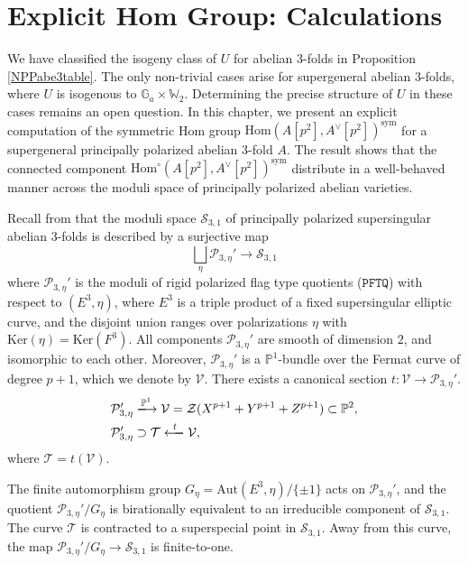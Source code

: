 \documentclass[a4paper,12pt,twoside]{report}
\newcommand{\G}{\mathbb{G}}
\newcommand{\Hom}{\mathrm{Hom}}
\newcommand{\W}{\mathbb{W}}
\newcommand{\sym}{\mathrm{sym}}
\newcommand{\Ker}{\mathrm{Ker}}
\newcommand{\PP}{\mathcal{P}}
\newcommand{\SSS}{\mathcal{S}}
\begin{document}
\chapter{Explicit Hom Group: Calculations} \label{Chap5}

We have classified the isogeny class of $U$ for abelian $3$-folds in Proposition \ref{NPPabe3table}. 
The only non-trivial cases arise for supergeneral abelian $3$-folds, where $U$ is isogenous to $\G_a\times \W_2$. 
Determining the precise structure of $U$ in these cases remains an open question. 
In this chapter, we present an explicit computation of the symmetric Hom group 
$\Hom(A[p^2],A^\vee[p^2])^{\sym}$ for a supergeneral
principally polarized abelian $3$-fold $A$. 
The result shows that the connected component $\Hom^{\circ}(A[p^2],A^\vee[p^2])^{\sym}$ 
distribute in a well-behaved manner 
across the moduli space of principally polarized abelian varieties. 

Recall from \cite{LiOo} that
the moduli space $\SSS_{3,1}$ of principally polarized supersingular abelian $3$-folds 
is described by a surjective map 
\[\bigsqcup_{\eta} \PP_{3,\eta}' \rightarrow \SSS_{3,1}\]
where $\PP_{3,\eta}'$ is the moduli of rigid polarized flag type quotients ($\mathtt{PFTQ}$) with respect to 
$(E^3, \eta)$, where $E^3$ is a triple product of a fixed supersingular elliptic curve, 
and the disjoint union ranges over polarizations $\eta$ with $\Ker(\eta)=\Ker(F^3)$. 
All components $\PP_{3,\eta}'$ are smooth of dimension $2$, and isomorphic to each other. 
Moreover, $\PP_{3,\eta}'$ is a $\mathbb{P}^1$-bundle over the Fermat curve of degree $p+1$, 
which we denote by $\mathcal{V}$. 
There exists a canonical section $t:\mathcal{V}\rightarrow \PP_{3,\eta}'$. 
\[\begin{aligned}
    &\PP_{3,\eta}'\xlongrightarrow{\mathbb{P}^1} \mathcal{V}=\mathcal{Z}(X^{p+1}+Y^{p+1}+Z^{p+1})\subset \mathbb{P}^2,\\
     &\PP_{3,\eta}'\supset \mathcal{T}\xlongleftarrow{t} \mathcal{V},
\end{aligned}\]
where $\mathcal{T}=t(\mathcal{V})$.

The finite automorphism group $G_\eta=\mathrm{Aut}(E^3, \eta)/\{\pm 1\}$ acts on $\PP_{3,\eta}'$, 
and the quotient $\PP_{3,\eta}'/G_\eta$ is birationally equivalent to an irreducible component of $\mathcal{S}_{3,1}$. 
The curve $\mathcal{T}$ is contracted to a superspecial point in $\mathcal{S}_{3,1}$. 
Away from this curve, the map $\PP_{3,\eta}'/G_\eta\rightarrow \mathcal{S}_{3,1}$ is finite-to-one. 
\end{document}
